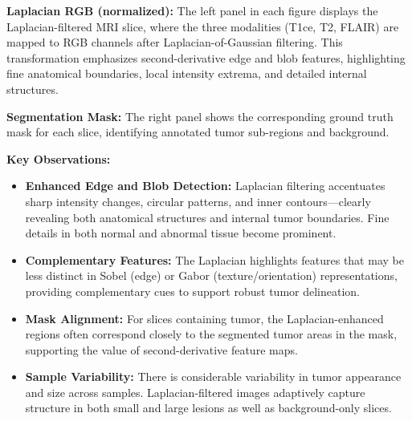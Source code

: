\textbf{Laplacian RGB (normalized):}  
The left panel in each figure displays the Laplacian-filtered MRI slice, where the three modalities (T1ce, T2, FLAIR) are mapped to RGB channels after Laplacian-of-Gaussian filtering. This transformation emphasizes second-derivative edge and blob features, highlighting fine anatomical boundaries, local intensity extrema, and detailed internal structures.

\textbf{Segmentation Mask:}  
The right panel shows the corresponding ground truth mask for each slice, identifying annotated tumor sub-regions and background.

\clearpage

\textbf{Key Observations:}
\begin{itemize}
    \item \textbf{Enhanced Edge and Blob Detection:} Laplacian filtering accentuates sharp intensity changes, circular patterns, and inner contours—clearly revealing both anatomical structures and internal tumor boundaries. Fine details in both normal and abnormal tissue become prominent.
    \item \textbf{Complementary Features:} The Laplacian highlights features that may be less distinct in Sobel (edge) or Gabor (texture/orientation) representations, providing complementary cues to support robust tumor delineation.
    \item \textbf{Mask Alignment:} For slices containing tumor, the Laplacian-enhanced regions often correspond closely to the segmented tumor areas in the mask, supporting the value of second-derivative feature maps.
    \item \textbf{Sample Variability:} There is considerable variability in tumor appearance and size across samples. Laplacian-filtered images adaptively capture structure in both small and large lesions as well as background-only slices.
\end{itemize}

